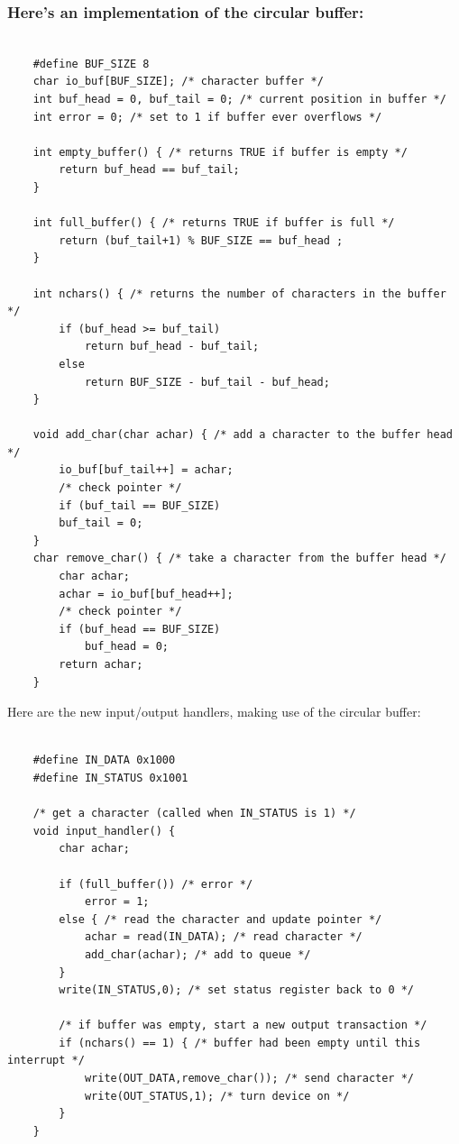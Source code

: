 \subsubsection{Here's an implementation of the circular buffer:}

\begin{lstlisting}

    #define BUF_SIZE 8
    char io_buf[BUF_SIZE]; /* character buffer */
    int buf_head = 0, buf_tail = 0; /* current position in buffer */
    int error = 0; /* set to 1 if buffer ever overflows */
    
    int empty_buffer() { /* returns TRUE if buffer is empty */
        return buf_head == buf_tail;
    }
    
    int full_buffer() { /* returns TRUE if buffer is full */
        return (buf_tail+1) % BUF_SIZE == buf_head ;
    }
    
    int nchars() { /* returns the number of characters in the buffer */
        if (buf_head >= buf_tail)
            return buf_head - buf_tail;
        else
            return BUF_SIZE - buf_tail - buf_head;
    }
    
    void add_char(char achar) { /* add a character to the buffer head */
        io_buf[buf_tail++] = achar;
        /* check pointer */
        if (buf_tail == BUF_SIZE)
        buf_tail = 0;
    }
    char remove_char() { /* take a character from the buffer head */
        char achar;
        achar = io_buf[buf_head++];
        /* check pointer */
        if (buf_head == BUF_SIZE)
            buf_head = 0;
        return achar;
    }
\end{lstlisting}

Here are the new input/output handlers, making use of the circular buffer:

\begin{lstlisting}

    #define IN_DATA 0x1000
    #define IN_STATUS 0x1001
    
    /* get a character (called when IN_STATUS is 1) */
    void input_handler() {
        char achar;
        
        if (full_buffer()) /* error */
            error = 1;
        else { /* read the character and update pointer */
            achar = read(IN_DATA); /* read character */
            add_char(achar); /* add to queue */
        }    
        write(IN_STATUS,0); /* set status register back to 0 */
        
        /* if buffer was empty, start a new output transaction */
        if (nchars() == 1) { /* buffer had been empty until this interrupt */
            write(OUT_DATA,remove_char()); /* send character */
            write(OUT_STATUS,1); /* turn device on */
        }
    }
\end{lstlisting}

